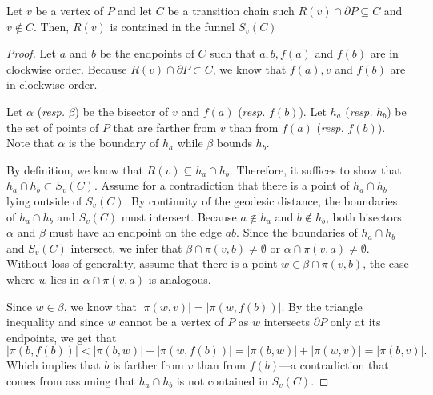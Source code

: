 \documentclass[a4paper,UKenglish]{lipics}
\newcommand{\fn}[2]{\ensuremath{S_{\scriptscriptstyle #1}(#2)}}
\newcommand{\ff}[1]{\ensuremath{f(#1)}}
\newcommand{\g}[2]{\ensuremath{|\pi(#1, #2)|}}
\newcommand{\p}[2]{\ensuremath{\pi(#1, #2)}}
\begin{document}
\begin{lemma}\label{lemma:Funnel contains Voronoi region}
Let $v$ be a vertex of $P$ and let $C$ be a transition chain such $R(v)\cap \partial P \subseteq C$ and $v\not\in C$.
Then, $R(v)$ is contained in the funnel $\fn{v}{C}$
\end{lemma}
\begin{proof}
Let $a$ and $b$ be the endpoints of $C$ such that $a,b, \ff{a}$ and $\ff{b}$ are in clockwise order.
Because $R(v)\cap \partial P\subset C$, we know that $\ff{a}, v$ and $\ff{b}$ are in clockwise order.

Let $\alpha$ (\emph{resp.} $\beta$) be the bisector of $v$ and $\ff{a}$ (\emph{resp.} $\ff{b}$).
Let $h_a$ (\emph{resp.} $h_b$) be the set of points of $P$ that are farther from $v$ than from $\ff{a}$ (\emph{resp.} $\ff{b}$).
Note that $\alpha$ is the boundary of $h_a$ while $\beta$ bounds $h_b$.

By definition, we know that $R(v)\subseteq h_a\cap h_b$. Therefore, it suffices to show that $h_a\cap h_b\subset \fn{v}{C}$.
Assume for a contradiction that there is a point of $h_a\cap h_b$ lying outside of $\fn{v}{C}$. 
By continuity of the geodesic distance, the boundaries of $h_a\cap h_b$ and $\fn{v}{C}$ must intersect.
Because $a\notin h_a$ and $b\notin h_b$, both bisectors $\alpha$ and $\beta$ must have an endpoint on the edge $ab$.
Since the boundaries of $h_a\cap h_b$ and $\fn{v}{C}$ intersect, we infer that $\beta \cap \p{v}{b}\neq \emptyset$ or $\alpha \cap \p{v}{a}\neq \emptyset$.
Without loss of generality, assume that there is a point $w\in \beta \cap \p{v}{b}$, the case where $w$ lies in $\alpha \cap \p{v}{a}$ is analogous. 

Since $w\in \beta$, we know that $\g{w}{v} = \g{w}{ \ff{b}}$. By the triangle inequality and since $w$ cannot be a vertex of $P$ as $w$ intersects $\partial P$ only at its endpoints, we get that
$$\g{b}{\ff{b}} < \g{b}{w} + \g{w}{\ff{b}} = \g{b}{w} + \g{w}{v} = \g{b}{v}.$$
Which implies that $b$ is farther from $v$ than from $\ff{b}$---a contradiction that comes from assuming that $h_a\cap h_b$ is not contained in $\fn{v}{C}$.
\end{proof}
\end{document}
